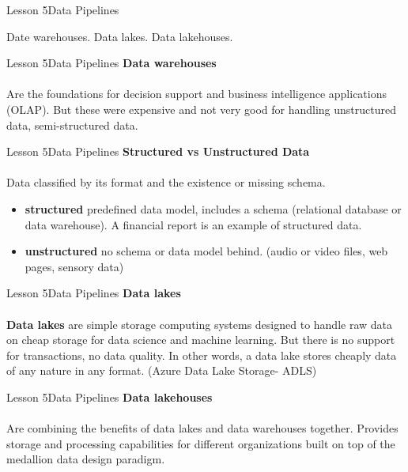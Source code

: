 \documentclass[aspectratio=1610]{beamer}
\begin{document}
\begin{frame}{Lesson 5}{Data Pipelines}
\Huge
\begin{center}
Date warehouses. Data lakes. Data lakehouses.
\end{center}
\end{frame}



\begin{frame}{Lesson 5}{Data Pipelines}
\LARGE
\textbf{Data warehouses}\\~\\
 Are the foundations for decision support and business intelligence 
 applications (\alert{OLAP}). But these were expensive and not very 
 good for handling unstructured data, semi-structured data.
\end{frame}



\begin{frame}{Lesson 5}{Data Pipelines}
\LARGE
\textbf{Structured vs Unstructured Data}\\~\\
Data classified by its format and the existence or missing schema.
\begin{itemize}
    \item \textbf{structured} predefined data model, includes a schema (relational database or data warehouse). A financial report is an example of structured data.
    \item \textbf{unstructured} no schema or data model behind. (audio or video files, web pages, sensory data)
\end{itemize}
\end{frame}



\begin{frame}{Lesson 5}{Data Pipelines}
\LARGE
\textbf{Data lakes}\\~\\
 \textbf{Data lakes} are simple storage computing systems designed 
 to handle raw data on cheap storage for data science and 
 machine learning. But there is no support for transactions, 
 no data quality. In other words, a data lake stores cheaply data of 
 any nature in any format. (Azure Data Lake Storage- ADLS)
\end{frame}




\begin{frame}{Lesson 5}{Data Pipelines}
\LARGE
\textbf{Data lakehouses}\\~\\
 Are combining the benefits of data lakes and data warehouses 
 together. Provides storage and processing capabilities for 
 different organizations built on top of the \alert{medallion data
 design paradigm}.
\end{frame}
\end{document}
